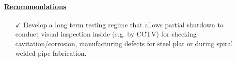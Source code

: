 \begin{itemize}
\paragraph{\underline{Recommendations}}
\begin{itemize}
	\item [$\checkmark$] Develop a long term testing regime that allows partial shutdown to conduct visual inspection inside (e.g. by CCTV) for checking cavitation/corrosion, manufacturing defects for steel plat or during spiral welded pipe fabrication.
\end{itemize}


\end{itemize}






%
%
%
%


